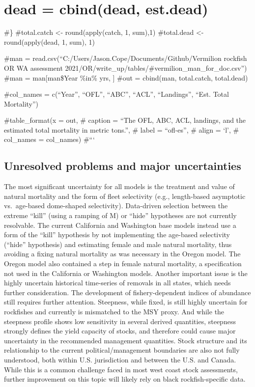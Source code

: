 \documentclass[11pt,
  english,
  letterpaper,
]{article}
\begin{document}
\hypertarget{dead-cbinddead-est.dead}{%
\section{dead = cbind(dead, est.dead)}\label{dead-cbinddead-est.dead}}

\#\} \#total.catch \textless- round(apply(catch, 1, sum),1) \#total.dead \textless- round(apply(dead, 1, sum), 1)

\#man = read.csv(``C:/Users/Jason.Cope/Documents/Github/Vermilion rockfish OR WA assessment 2021/OR/write\_up/tables/\#vermilion\_man\_for\_doc.csv'') \#man = man{[}man\$Year \%in\% yrs, {]} \#out = cbind(man, total.catch, total.dead)

\#col\_names = c(``Year'', ``OFL'', ``ABC'', ``ACL'', ``Landings'', ``Est. Total Mortality'')

\#table\_format(x = out, \# caption = ``The OFL, ABC, ACL, landings, and the estimated total mortality in metric tons.'', \# label = ``ofl-es'', \# align = `l', \# col\_names = col\_names) \#```

\hypertarget{unresolved-problems-and-major-uncertainties}{%
\subsection*{Unresolved problems and major uncertainties}\label{unresolved-problems-and-major-uncertainties}}

The most significant uncertainty for all models is the treatment and value of natural mortality and the form of fleet selectivity (e.g., length-based asymptotic vs.~age-based dome-shaped selectivity). Data-driven selection between the extreme ``kill'' (using a ramping of M) or ``hide'' hypotheses are not currently resolvable. The current California and Washington base models instead use a form of the ``kill'' hypothesis by not implementing the age-based selectivity (``hide'' hypothesis) and estimating female and male natural mortality, thus avoiding a fixing natural mortality as was necessary in the Oregon model. The Oregon model also contained a step in female natural mortality, a specification not used in the California or Washington models. Another important issue is the highly uncertain historical time-series of removals in all states, which needs further consideration. The development of fishery-dependent indices of abundance still requires further attention. Steepness, while fixed, is still highly uncertain for rockfishes and currently is mismatched to the MSY proxy. And while the steepness profile shows low sensitivity in several derived quantities, steepness strongly defines the yield capacity of stocks, and therefore could cause major uncertainty in the recommended management quantities. Stock structure and its relationship to the current political/management boundaries are also not fully understood, both within U.S. jurisdiction and between the U.S. and Canada. While this is a common challenge faced in most west coast stock assessments, further improvement on this topic will likely rely on black rockfish-specific data.
\end{document}
